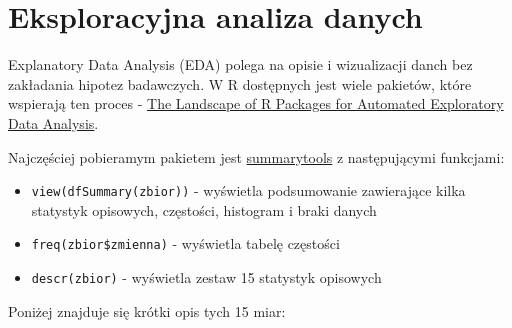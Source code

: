 \documentclass[
]{book}
\providecommand{\tightlist}{%
  \setlength{\itemsep}{0pt}\setlength{\parskip}{0pt}}
\begin{document}
\hypertarget{eksploracyjna-analiza-danych}{%
\section{Eksploracyjna analiza danych}\label{eksploracyjna-analiza-danych}}

Explanatory Data Analysis (EDA) polega na opisie i wizualizacji danch bez zakładania hipotez badawczych. W R dostępnych jest wiele pakietów, które wspierają ten proces - \href{https://journal.r-project.org/archive/2019/RJ-2019-033/index.html}{The Landscape of R Packages for Automated Exploratory Data Analysis}.

Najczęściej pobieramym pakietem jest \href{https://cran.r-project.org/web/packages/summarytools/vignettes/Introduction.html}{summarytools} z następującymi funkcjami:

\begin{itemize}
\tightlist
\item
  \texttt{view(dfSummary(zbior))} - wyświetla podsumowanie zawierające kilka statystyk opisowych, częstości, histogram i braki danych
\item
  \texttt{freq(zbior\$zmienna)} - wyświetla tabelę częstości
\item
  \texttt{descr(zbior)} - wyświetla zestaw 15 statystyk opisowych
\end{itemize}

Poniżej znajduje się krótki opis tych 15 miar:
\end{document}
